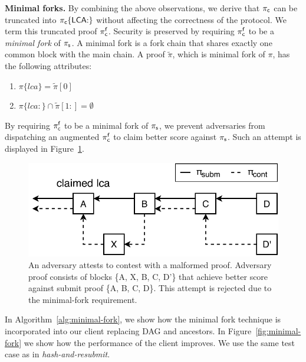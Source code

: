\noindent \textbf{Minimal forks.} By combining the above observations, we
derive that $\mathsf{\pi_{c}}$ can be truncated into $\mathsf{\pi_{c}}\{\mathsf{LCA}{:}\}$ without affecting
the correctness of the protocol. We term this truncated proof $\mathsf{\pi_{c}^{f}}$.
Security is preserved by requiring $\mathsf{\pi_{c}^{f}}$ to be a \emph{minimal fork} of
$\mathsf{\pi_{s}}$. A minimal fork is a fork chain that shares exactly one common block
with the main chain. A proof $\tilde\pi$, which is minimal fork of $\pi$, has
the following attributes:

\begin{enumerate}
\item $\pi\{lca\} = \tilde\pi[0]$
\item $\pi\{lca{:}\} \cap \tilde\pi[1{:}] = \emptyset$
\end{enumerate}

By requiring $\mathsf{\pi_{c}^{f}}$ to be a minimal fork of $\mathsf{\pi_{s}}$, we prevent adversaries
from dispatching an augmented $\mathsf{\pi_{c}^{f}}$ to claim better score against $\mathsf{\pi_{s}}$.
Such an attempt is displayed in Figure~\ref{fig:adversary-minimal-fork}.

\begin{figure}[h]
    \begin{center}
        \includegraphics[width=0.85\columnwidth]{figures/adversary-minimal-fork.pdf}
    \end{center}
\vspace*{-5mm}
    \caption{An adversary attests to contest with a malformed proof. Adversary
        proof consists of blocks \{A, X, B, C, D'\} that achieve better score
        against submit proof \{A, B, C, D\}. This attempt is rejected due to
        the minimal-fork requirement.}
    \label{fig:adversary-minimal-fork}
\vspace*{-5mm}
\end{figure}

In Algorithm~\ref{alg:minimal-fork}, we show how the minimal fork technique is
incorporated into our client replacing DAG and ancestors. In
Figure~\ref{fig:minimal-fork} we show how the performance of the client
improves. We use the same test case as in \emph{hash-and-resubmit}.

